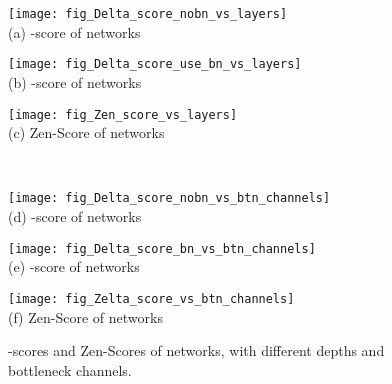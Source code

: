 \documentclass{article}
\begin{document}
\begin{figure*}[!]
  \begin{minipage}{0.32\linewidth}
    \begin{center}
      \texttt{[image: fig\_Delta\_score\_nobn\_vs\_layers]}\\
      (a) -score of  networks
    \end{center}
  \end{minipage}
  \hfil
  \begin{minipage}{0.32\linewidth}
    \centering
    \begin{center}
      \texttt{[image: fig\_Delta\_score\_use\_bn\_vs\_layers]}\\
      (b) -score of  networks
    \end{center}    
  \end{minipage}
  \hfil
  \begin{minipage}{0.32\linewidth}
    \centering
    \begin{center}
      \texttt{[image: fig\_Zen\_score\_vs\_layers]}\\
      (c) Zen-Score of  networks
    \end{center}    
  \end{minipage} \\
  \begin{minipage}{0.32\linewidth}    
    \begin{center}
      \texttt{[image: fig\_Delta\_score\_nobn\_vs\_btn\_channels]}\\
      (d) -score of  networks
    \end{center}    
  \end{minipage}
  \hfil 
  \begin{minipage}{0.32\linewidth}
    \centering
    \begin{center}
      \texttt{[image: fig\_Delta\_score\_bn\_vs\_btn\_channels]}\\
      (e) -score of  networks
    \end{center}    
  \end{minipage}
  \hfil 
  \begin{minipage}{0.32\linewidth}
    \centering
    \begin{center}
      \texttt{[image: fig\_Zelta\_score\_vs\_btn\_channels]}\\
      (f) Zen-Score of  networks
    \end{center}    
  \end{minipage}      
  \caption{-scores and Zen-Scores of networks, with different depths and bottleneck channels.}
  \label{fig:delta-zen-score-vs-channel-layer}
\end{figure*}
\end{document}
